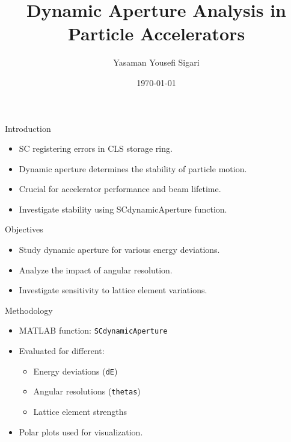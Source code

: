 \documentclass{beamer}
\title{Dynamic Aperture Analysis in Particle Accelerators}
\author{Yasaman Yousefi Sigari}
\institute{CLS \& UofS}
\date{\today}
\begin{document}
\begin{frame}
    \titlepage
\end{frame}

\begin{frame}{Introduction}
    \begin{itemize}
	\item SC registering errors in CLS storage ring.
        \item Dynamic aperture determines the stability of particle motion.
        \item Crucial for accelerator performance and beam lifetime.
        \item Investigate stability using SCdynamicAperture function.
    \end{itemize}
\end{frame}

\begin{frame}{Objectives}
    \begin{itemize}
        \item Study dynamic aperture for various energy deviations.
        \item Analyze the impact of angular resolution.
        \item Investigate sensitivity to lattice element variations.
    \end{itemize}
\end{frame}

\begin{frame}{Methodology}
    \begin{itemize}
        \item MATLAB function: \texttt{SCdynamicAperture}
        \item Evaluated for different:
        \begin{itemize}
            \item Energy deviations (\texttt{dE})
            \item Angular resolutions (\texttt{thetas})
            \item Lattice element strengths
        \end{itemize}
        \item Polar plots used for visualization.
    \end{itemize}
\end{frame}
\end{document}
